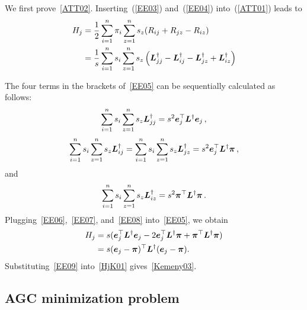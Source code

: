 \documentclass[journal]{IEEEtran}
\begin{document}
\begin{IEEEproof}
    We first prove~\eqref{ATT02}. Inserting~(\ref{EE03}) and~(\ref{EE04}) into~(\ref{ATT01}) leads to
    \begin{equation}\label{EE05}
        \begin{split}
            H_j&=\frac{1}{2} \sum_{i=1}^{n} \pi_i \sum_{z=1}^{n} s_z(R_{ij}+R_{jz}-R_{iz}) \\
            &=\frac{1}{s} \sum_{i=1}^{n} s_i \sum_{z=1}^{n} s_z \left({\boldsymbol{L}}_{jj}^{\dagger}-{\boldsymbol{L}}_{ij}^{\dagger}-{\boldsymbol{L}}_{jz}^{\dagger}+{\boldsymbol{L}}_{iz}^{\dagger}\right) \\
        \end{split}
    \end{equation}

    The  four terms in the brackets of~\eqref{EE05}  can be sequentially calculated as follows:
    \begin{equation}\label{EE06}
        \sum_{i=1}^{n} s_i \sum_{z=1}^{n} s_z {\boldsymbol{L}}_{jj}^{\dagger}=s^2 \boldsymbol{e}_j^{\top} \boldsymbol{L}^{\dagger} \boldsymbol{e}_j\,,
    \end{equation}
    \begin{equation}\label{EE07}
        \sum_{i=1}^{n} s_i \sum_{z=1}^{n} s_z {\boldsymbol{L}}_{ij}^{\dagger}=\sum_{i=1}^{n} s_i \sum_{z=1}^{n} s_z {\boldsymbol{L}}_{jz}^{\dagger}=s^2 \boldsymbol{e}_j^{\top} \boldsymbol{L}^{\dagger} \boldsymbol{\pi}\,,
    \end{equation}
    and
    \begin{equation}\label{EE08}
        \sum_{i=1}^{n} s_i  \sum_{z=1}^{n} s_z {\boldsymbol{L}}_{iz}^{\dagger}=s^2 \boldsymbol{\pi}^{\top} \boldsymbol{L}^{\dagger} \boldsymbol{\pi} \,.
    \end{equation}
    Plugging~\eqref{EE06},~\eqref{EE07}, and~\eqref{EE08}  into~\eqref{EE05}, we obtain
    \begin{equation}\label{EE09}
        \begin{split}
            H_j&=s(\boldsymbol{e}_j^{\top} \boldsymbol{L}^{\dagger} \boldsymbol{e}_j - 2 \boldsymbol{e}_j^{\top} \boldsymbol{L}^{\dagger} \boldsymbol{\pi} + \boldsymbol{\pi}^{\top} \boldsymbol{L}^{\dagger} \boldsymbol{\pi}) \\
            &=s(\boldsymbol{e}_j - \boldsymbol{\pi})^{\top} \boldsymbol{L}^{\dagger} (\boldsymbol{e}_j - \boldsymbol{\pi}).
        \end{split}
    \end{equation}
    Substituting~\eqref{EE09}  into~\eqref{HjK01} gives~\eqref{Kemeny03}.
\end{IEEEproof}

\subsection{AGC minimization problem}
\end{document}
